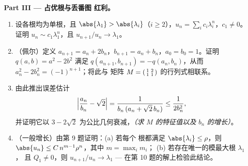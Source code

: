 \begin{problem}
\medskip
\noindent\textbf{Part III --- 占优根与丢番图
红利。}
\begin{enumerate}[resume]
  \item 设各根均为单根，且 $\abs{\lambda_1} >
        \abs{\lambda_i}$（$i \geq 2$），$u_n = \sum_i c_i
        \lambda_i^n$，$c_1 \neq 0$。证明 $u_n \sim
        c_1\lambda_1^n$，且 $u_{n+1}/u_n \to \lambda_1$。
  \item （佩尔）定义 $a_{n+1} = a_n + 2b_n$，$b_{n+1} = a_n +
        b_n$，$a_0 = b_0 = 1$。证明 $q(a, b) = a^2 - 2b^2$
        满足 $q(a_{n+1}, b_{n+1}) = -q(a_n, b_n)$，从而
        $a_n^2 - 2b_n^2 = (-1)^{n+1}$；将此与
        矩阵 $M = \begin{psmallmatrix}1 & 2\\ 1 &
        1\end{psmallmatrix}$ 的行列式相联系。
  \item 由此推出误差估计
        \[
        \Bigl|\frac{a_n}{b_n} - \sqrt2\Bigr|
        = \frac{1}{b_n\,(a_n + \sqrt2\,b_n)}
        \leq \frac{1}{2b_n^2},
        \]
        并证明它以 $3 -
        2\sqrt2$ 为公比几何衰减，\emph{（求 $M$ 的特征值以及
        $b_n$ 的增长）}。
  \item （一般增长）由第 9 题证明：(a) 若每个
        根都满足 $\abs{\lambda_i} \leq \rho$，则
        $\abs{u_n} \leq C\,n^{m-1}\rho^n$，其中 $m = \max_i m_i$；
        (b) 若存在唯一的模最大根 $\lambda_1$，
        且 $Q_1 \neq 0$，则 $u_{n+1}/u_n \to
        \lambda_1$ --- 在第 10 题的解上检验此结论。
\end{enumerate}


\end{problem}
